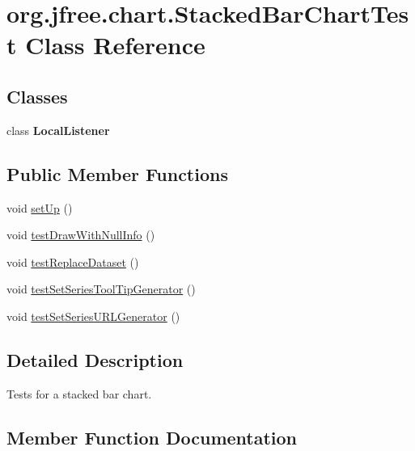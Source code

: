 \hypertarget{classorg_1_1jfree_1_1chart_1_1_stacked_bar_chart_test}{}\section{org.\+jfree.\+chart.\+Stacked\+Bar\+Chart\+Test Class Reference}
\label{classorg_1_1jfree_1_1chart_1_1_stacked_bar_chart_test}
\subsection*{Classes}
\begin{DoxyCompactItemize}
\item 
class {\bfseries Local\+Listener}
\end{DoxyCompactItemize}
\subsection*{Public Member Functions}
\begin{DoxyCompactItemize}
\item 
void \mbox{\hyperlink{classorg_1_1jfree_1_1chart_1_1_stacked_bar_chart_test_a1b8840c3ca6ffc14ed631736f428645c}{set\+Up}} ()
\item 
void \mbox{\hyperlink{classorg_1_1jfree_1_1chart_1_1_stacked_bar_chart_test_aae42668dbe7e1221c76bb39fd68756ac}{test\+Draw\+With\+Null\+Info}} ()
\item 
void \mbox{\hyperlink{classorg_1_1jfree_1_1chart_1_1_stacked_bar_chart_test_ad5131179653fc2644bb588d87bd54760}{test\+Replace\+Dataset}} ()
\item 
void \mbox{\hyperlink{classorg_1_1jfree_1_1chart_1_1_stacked_bar_chart_test_a2d628d1b8ec196f5f855b5a9523ea2e4}{test\+Set\+Series\+Tool\+Tip\+Generator}} ()
\item 
void \mbox{\hyperlink{classorg_1_1jfree_1_1chart_1_1_stacked_bar_chart_test_a944f9530fd6837fe964aed77ea67be80}{test\+Set\+Series\+U\+R\+L\+Generator}} ()
\end{DoxyCompactItemize}


\subsection{Detailed Description}
Tests for a stacked bar chart. 

\subsection{Member Function Documentation}
\mbox{\label{classorg_1_1jfree_1_1chart_1_1_stacked_bar_chart_test_a1b8840c3ca6ffc14ed631736f428645c}} 
